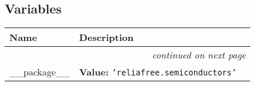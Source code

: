
  \subsection{Variables}

    \vspace{-1cm}
\hspace{\varindent}\begin{longtable}{|p{\varnamewidth}|p{\vardescrwidth}|l}
\cline{1-2}
\cline{1-2} \centering \textbf{Name} & \centering \textbf{Description}& \\
\cline{1-2}
\endhead\cline{1-2}\multicolumn{3}{r}{\small\textit{continued on next page}}\\\endfoot\cline{1-2}
\endlastfoot\raggedright \_\-\_\-p\-a\-c\-k\-a\-g\-e\-\_\-\_\- & \raggedright \textbf{Value:} 
{\tt \texttt{'}\texttt{reliafree.semiconductors}\texttt{'}}&\\
\cline{1-2}
\end{longtable}

